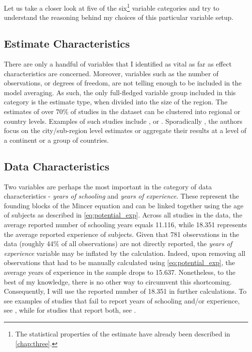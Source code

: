 Let us take a closer look at five of the six\footnote{The statistical properties of the estimate have already been described in \autoref{chap:three}.} variable categories and try to understand the reasoning behind my choices of this particular variable setup.

\subsection{Estimate Characteristics}
\label{subsec:estimate_char}

There are only a handful of variables that I identified as vital as far as effect characteristics are concerned. Moreover, variables such as the number of observations, or degrees of freedom, are not telling enough to be included in the model averaging. As such, the only full-fledged variable group included in this category is the estimate type, when divided into the size of the region. The estimates of over 70\% of studies in the dataset can be clustered into regional or country levels. Examples of such studies include \cite{walker2008college, fang2012returns}, or \cite{angrist1991compulsory}. Sporadically \citep{krafft2019what, chanis2021tell}, the authors focus on the city/sub-region level estimates or aggregate their results at a level of a continent or a group of countries.

\subsection{Data Characteristics}
\label{subsec:data_char}

Two variables are perhaps the most important in the category of data characteristics - \textit{years of schooling} and \textit{years of experience}. These represent the founding blocks of the Mincer equation and can be linked together using the age of subjects as described in \autoref{eq:potential_exp}. Across all studies in the data, the average reported number of schooling years equals 11.116, while 18.351 represents the average reported experience of subjects. Given that 781 observations in the data (roughly 44\% of all observations) are not directly reported, the \textit{years of experience} variable may be inflated by the calculation. Indeed, upon removing all observations that had to be manually calculated using \autoref{eq:potential_exp}, the average years of experience in the sample drops to 15.637. Nonetheless, to the best of my knowledge, there is no other way to circumvent this shortcoming. Consequently, I will use the reported number of 18.351 in further calculations. To see examples of studies that fail to report years of schooling and/or experience, see \cite{pischke2005zero, psacharopoulos1982earnings}, while for studies that report both, see \cite{belzil2002unobserved, girma2005heterogeneity}.

